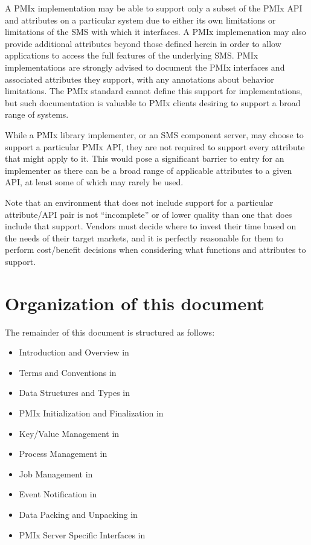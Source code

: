 A \ac{PMIx} implementation may be able to support only a subset of the \ac{PMIx} \acs{API} and attributes on
a particular system due to either its own limitations or limitations of the \ac{SMS} with which it interfaces.
A \ac{PMIx} implemenation may also provide additional attributes beyond those defined herein in order to allow
applications to access the full features of the underlying \ac{SMS}.
\ac{PMIx} implementations are strongly advised to document the \ac{PMIx} interfaces and associated attributes they support, with any annotations about behavior limitations.
The \ac{PMIx} standard cannot define this support for implementations, but such documentation is valuable to \ac{PMIx} clients desiring to support a broad range of systems.

While a \ac{PMIx} library implementer, or an \ac{SMS} component server, may choose to support a particular \ac{PMIx} \ac{API}, they are not required to support every attribute that might apply to it. This would pose a significant barrier to entry for an implementer as there can be a broad range of applicable attributes to a given \ac{API}, at least some of which may rarely be used. 

Note that an environment that does not include support for a particular attribute/\ac{API} pair is not ``incomplete'' or of lower quality than one that does include that support. Vendors must decide where to invest their time based on the needs of their target markets, and it is perfectly reasonable for them to perform cost/benefit decisions when considering what functions and attributes to support.

\section{Organization of this document}

The remainder of this document is structured as follows:

\begin{itemize}
\item Introduction and Overview in 
\item Terms and Conventions in 
\item Data Structures and Types in 
\item \ac{PMIx} Initialization and Finalization in 
\item Key/Value Management in 
\item Process Management in 
\item Job Management in 
\item Event Notification in 
\item Data Packing and Unpacking in 
\item \ac{PMIx} Server Specific Interfaces in 
\end{itemize}

